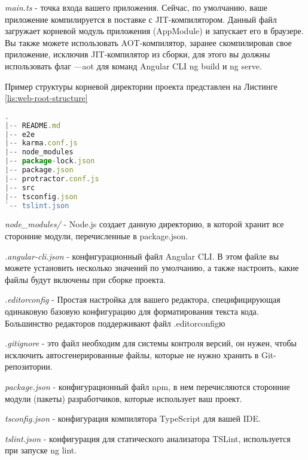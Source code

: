 \textit{main.ts} - точка входа вашего приложения.
Сейчас, по умолчанию, ваше приложение компилируется в поставке с JIT-компилятором.
Данный файл загружает корневой модуль приложения (AppModule) и запускает его в браузере.
Вы также можете использовать AOT-компилятор, заранее скомпилировав свое приложение, исключив JIT-компилятор из сборки, для этого вы должны использовать флаг —aot для команд Angular CLI ng build и ng serve.

Пример структуры корневой директории проекта представлен на Листинге \ref{lis:web-root-structure}

\begin{lstlisting}[language=TypeScript, captionpos=b,
label={lis:web-root-structure},
caption={Пример структуры корневой директории проекта}]
.
|-- README.md
|-- e2e
|-- karma.conf.js
|-- node_modules
|-- package-lock.json
|-- package.json
|-- protractor.conf.js
|-- src
|-- tsconfig.json
`-- tslint.json

\end{lstlisting}

\textit{node\_modules/} - Node.js создает данную директорию, в которой хранит все сторонние модули, перечисленные в package.json.

\textit{.angular-cli.json} - конфигурационный файл Angular CLI. В этом файле вы можете установить несколько значений по умолчанию, а также настроить, какие файлы будут включены при сборке проекта.

\textit{.editorconfig} - Простая настройка для вашего редактора, специфицирующая одинаковую базовую конфигурацию для форматирования текста кода.
Большинство редакторов поддерживают файл .editorconfigю

\textit{.gitignore} - это файл необходим для системы контроля версий, он нужен, чтобы исключить автосгенерированные файлы, которые не нужно хранить в Git-репозитории.

\textit{package.json} - конфигурационный файл npm, в нем перечисляются сторонние модули (пакеты) разработчиков, которые использует ваш проект.

\textit{tsconfig.json} - конфигурация компилятора TypeScript для вашей IDE.

\textit{tslint.json} - конфигурация для статического анализатора TSLint, используется при запуске ng lint.

